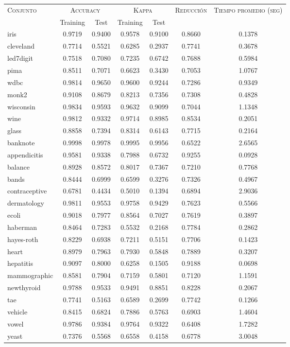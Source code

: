 \begin{table}[]
\centering
\begin{tabular}{l c c c c c c}
\hline
\multirow{2}{*}{\textsc{Conjunto}}
	& \multicolumn{2}{c}{\textsc{Accuracy}}
	& \multicolumn{2}{c}{\textsc{Kappa}}
	& \textsc{Reducción}
	& \textsc{Tiempo promedio (seg)} \\
	& Training & Test
	& Training & Test \\ 
\hline
\hline

iris & 0.9719 & 0.9400 & 0.9578 & 0.9100 & 0.8660 & 0.1378 \\
cleveland & 0.7714 & 0.5521 & 0.6285 & 0.2937 & 0.7741 & 0.3678 \\
led7digit & 0.7518 & 0.7080 & 0.7235 & 0.6742 & 0.7688 & 0.5984 \\
pima & 0.8511 & 0.7071 & 0.6623 & 0.3430 & 0.7053 & 1.0767 \\
wdbc & 0.9814 & 0.9650 & 0.9600 & 0.9244 & 0.7286 & 0.9349 \\
monk2 & 0.9108 & 0.8679 & 0.8213 & 0.7356 & 0.7308 & 0.4828 \\
wisconsin & 0.9834 & 0.9593 & 0.9632 & 0.9099 & 0.7044 & 1.1348 \\
wine & 0.9812 & 0.9332 & 0.9714 & 0.8985 & 0.8534 & 0.2051 \\
glass & 0.8858 & 0.7394 & 0.8314 & 0.6143 & 0.7715 & 0.2164 \\
banknote & 0.9998 & 0.9978 & 0.9995 & 0.9956 & 0.6522 & 2.6565 \\
appendicitis & 0.9581 & 0.9338 & 0.7988 & 0.6732 & 0.9255 & 0.0928 \\
balance & 0.8928 & 0.8572 & 0.8017 & 0.7367 & 0.7210 & 0.7768 \\
bands & 0.8444 & 0.6999 & 0.6599 & 0.3276 & 0.7326 & 0.4967 \\
contraceptive & 0.6781 & 0.4434 & 0.5010 & 0.1394 & 0.6894 & 2.9036 \\
dermatology & 0.9811 & 0.9553 & 0.9758 & 0.9429 & 0.7623 & 0.5566 \\
ecoli & 0.9018 & 0.7977 & 0.8564 & 0.7027 & 0.7619 & 0.3897 \\
haberman & 0.8464 & 0.7283 & 0.5532 & 0.2168 & 0.7784 & 0.2862 \\
hayes-roth & 0.8229 & 0.6938 & 0.7211 & 0.5151 & 0.7706 & 0.1423 \\
heart & 0.8979 & 0.7963 & 0.7930 & 0.5848 & 0.7889 & 0.3207 \\
hepatitis & 0.9097 & 0.8000 & 0.6258 & 0.1505 & 0.9188 & 0.0698 \\
mammographic & 0.8581 & 0.7904 & 0.7159 & 0.5801 & 0.7120 & 1.1591 \\
newthyroid & 0.9788 & 0.9533 & 0.9491 & 0.8851 & 0.8228 & 0.2067 \\
tae & 0.7741 & 0.5163 & 0.6589 & 0.2699 & 0.7742 & 0.1266 \\
vehicle & 0.8415 & 0.6824 & 0.7886 & 0.5763 & 0.6903 & 1.4604 \\
vowel & 0.9786 & 0.9384 & 0.9764 & 0.9322 & 0.6408 & 1.7282 \\
yeast & 0.7376 & 0.5568 & 0.6558 & 0.4158 & 0.6778 & 3.0048 \\


\end{tabular}
\end{table}
